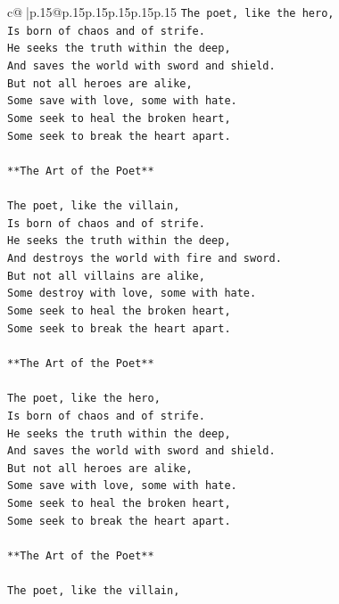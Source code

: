 \documentclass{article}
\begin{document}
{\begin{supertabular}{c@{$\;$}|p{.15\linewidth}@{}p{.15\linewidth}p{.15\linewidth}p{.15\linewidth}p{.15\linewidth}p{.15\linewidth}}
{{{\texttt{The poet, like the hero,} \\
\texttt{Is born of chaos and of strife.} \\
\texttt{He seeks the truth within the deep,} \\
\texttt{And saves the world with sword and shield.} \\
\texttt{But not all heroes are alike,} \\
\texttt{Some save with love, some with hate.} \\
\texttt{Some seek to heal the broken heart,} \\
\texttt{Some seek to break the heart apart.} \\
\\ 
\texttt{**The Art of the Poet**} \\
\\ 
\texttt{The poet, like the villain,} \\
\texttt{Is born of chaos and of strife.} \\
\texttt{He seeks the truth within the deep,} \\
\texttt{And destroys the world with fire and sword.} \\
\texttt{But not all villains are alike,} \\
\texttt{Some destroy with love, some with hate.} \\
\texttt{Some seek to heal the broken heart,} \\
\texttt{Some seek to break the heart apart.} \\
\\ 
\texttt{**The Art of the Poet**} \\
\\ 
\texttt{The poet, like the hero,} \\
\texttt{Is born of chaos and of strife.} \\
\texttt{He seeks the truth within the deep,} \\
\texttt{And saves the world with sword and shield.} \\
\texttt{But not all heroes are alike,} \\
\texttt{Some save with love, some with hate.} \\
\texttt{Some seek to heal the broken heart,} \\
\texttt{Some seek to break the heart apart.} \\
\\ 
\texttt{**The Art of the Poet**} \\
\\ 
\texttt{The poet, like the villain,} \\
}}}
\end{supertabular}}
\end{document}
